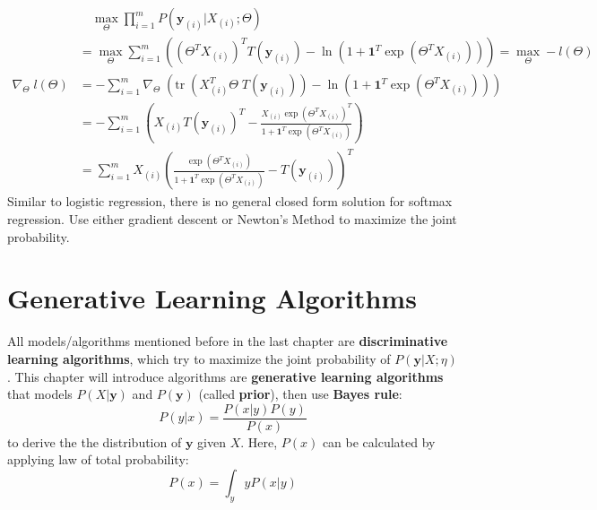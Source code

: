 \documentclass{article}
\renewcommand{\pmb}[1]{\boldsymbol{#1}}
\newcommand{\grad}[1]{\nabla_{#1}\;}
\newcommand{\tr}{\text{tr}\;}
\newcommand{\ddfrac}[2]{\frac{\displaystyle #1}{\displaystyle #2}}
\begin{document}
\begin{align*}
    &\quad \max_{\Theta} \prod_{i=1}^m P(\pmb y_{(i)} | X_{(i)}; \Theta) \\
    &= \max_{\Theta} \sum_{i=1}^m ( (\Theta^T X_{(i)})^T T(\pmb y_{(i)}) - \ln (1 + \pmb 1^T \exp (\Theta^T X_{(i)}))) = \max_\Theta -l(\Theta) \\ 
    \grad{\Theta} l(\Theta) &= -\sum_{i=1}^m \grad{\Theta} \left( \tr \left( X_{(i)}^T \Theta \; T(\pmb y_{(i)}) \right) - \ln (1 + \pmb 1^T \exp (\Theta^T  X_{(i)}) )   \right) \\ 
    &= -\sum_{i=1}^m \left( X_{(i)} T(\pmb y_{(i)})^T - \ddfrac{ X_{(i)} \exp (\Theta^T X_{(i)})^T }{1 + \pmb 1^T \exp(\Theta^T X_{(i)} )} \right) \\ 
    &= \sum_{i=1}^m X_{(i)} \left(\ddfrac{ \exp (\Theta^T X_{(i)}) }{1 + \pmb 1^T \exp(\Theta^T X_{(i)} )} - T(\pmb y_{(i)}) \right)^T 
\end{align*}
Similar to logistic regression, there is no general closed form solution for softmax regression. Use either gradient descent or Newton's Method to maximize the joint probability.
\section{Generative Learning Algorithms}
All models/algorithms mentioned before in the last chapter are \textbf{discriminative learning algorithms}, which try to maximize the joint probability of $P(\pmb y | X; \eta)$. This chapter will introduce algorithms are \textbf{generative learning algorithms} that models $P(X | \pmb y)$ and $P(\pmb y)$ (called \textbf{prior}), then use \textbf{Bayes rule}:
$$P(y|x) = \frac{P(x|y) P(y)}{P(x)}$$ 
to derive the the distribution of $\pmb y$ given $X$.
Here, $P(x)$ can be calculated by applying law of total probability: 
$$P(x) = \int_{y} y P(x|y)$$
\end{document}
